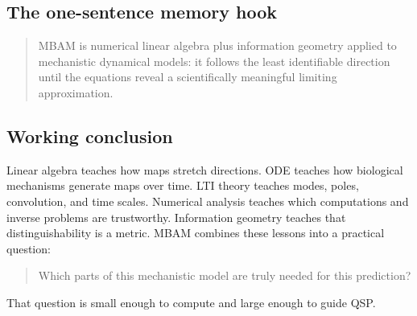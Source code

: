 \documentclass[a4paper]{article}
\begin{document}
\subsection{The one-sentence memory hook}

\begin{quote}
  MBAM is numerical linear algebra plus information geometry applied to mechanistic dynamical models: it follows the least identifiable direction until the equations reveal a scientifically meaningful limiting approximation.
\end{quote}

\subsection{Working conclusion}

Linear algebra teaches how maps stretch directions.  ODE teaches how biological mechanisms generate maps over time.  LTI theory teaches modes, poles, convolution, and time scales.  Numerical analysis teaches which computations and inverse problems are trustworthy.  Information geometry teaches that distinguishability is a metric.  MBAM combines these lessons into a practical question:
\begin{quote}
  Which parts of this mechanistic model are truly needed for this prediction?
\end{quote}

That question is small enough to compute and large enough to guide QSP.
\end{document}
